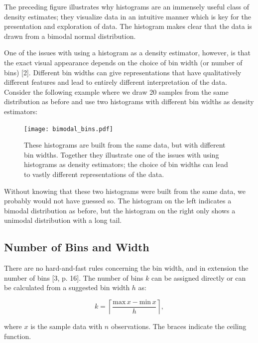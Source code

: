 The preceding figure illustrates why histograms are an immensely useful class of density estimates; they visualize data in an intuitive manner which is key for the presentation and exploration of data. The histogram makes clear that the data is drawn from a bimodal normal distribution.

One of the issues with using a histogram as a density estimator, however, is that the exact visual appearance depends on the choice of bin width (or number of bins) [2]. Different bin widths can give representations that have qualitatively different features and lead to entirely different interpretation of the data. Consider the following example where we draw 20 samples from the same distribution as before and use two histograms with different bin widths as density estimators:

\begin{figure}[H]
    \centering
    \texttt{[image: bimodal\_bins.pdf]}
    \caption{These histograms are built from the same data, but with different bin widths. Together they illustrate one of the issues with using histograms as density estimators; the choice of bin widths can lead to vastly different representations of the data.}
    \label{fig:bimodal_bins}
\end{figure}

Without knowing that these two histograms were built from the same data, we probably would not have guessed so. The histogram on the left indicates a bimodal distribution as before, but the histogram on the right only shows a unimodal distribution with a long tail.   


\subsection*{Number of Bins and Width}\label{sec:binning}


There are no hard-and-fast rules concerning the bin width, and in extension the number of bins [3, p. 16]. The number of bins $k$ can be assigned directly or can be calculated from a suggested bin width $h$ as:

\begin{equation}
    k = \left \lceil \frac{\mathrm{max}\, x - \mathrm{min}\, x}{h} \right \rceil, 
\end{equation}

where $x$ is the sample data with $n$ observations. The braces indicate the ceiling function.

